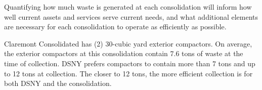 
    Quantifying how much waste is generated at each consolidation will inform how well current assets and services serve current needs, and what additional elements are necessary for each consolidation to operate as efficiently as possible.
    
    Claremont Consolidated has (2) 30-cubic yard exterior compactors. On average, the exterior compactors at this consolidation contain 7.6 tons of waste at the time of collection. DSNY prefers compactors to contain more than 7 tons and up to 12 tons at collection. The closer to 12 tons, the more efficient collection is for both DSNY and the consolidation.